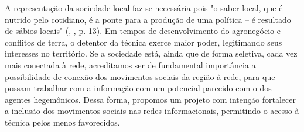 A representação da sociedade local faz-se necessária pois  "o saber local, que é nutrido pelo cotidiano, é a ponte para a produção de uma política – é resultado de sábios locais" (\citeauthor{santos1999}, \citeyear{santos1999}, p. 13). Em tempos de desenvolvimento do agronegócio e conflitos de terra, o detentor da técnica exerce maior poder, legitimando seus interesses no território. Se a sociedade está, ainda que de forma seletiva, cada vez mais conectada à rede, acreditamos ser de fundamental importância a possibilidade de conexão dos movimentos sociais da região à rede, para que possam trabalhar com a informação com um potencial parecido com o dos agentes hegemônicos. Dessa forma, propomos um projeto com intenção fortalecer a inclusão dos movimentos sociais nas redes informacionais, permitindo o acesso à técnica pelos menos favorecidos.

